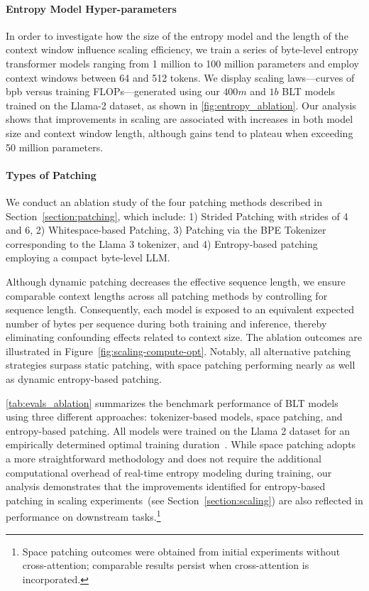 \paragraph{Entropy Model Hyper-parameters} In order to investigate how the size of the entropy model and the length of the context window influence scaling efficiency, we train a series of byte-level entropy transformer models ranging from 1 million to 100 million parameters and employ context windows between 64 and 512 tokens. We display scaling laws—curves of bpb versus training FLOPs—generated using our $400m$ and $1b$ {\textsc BLT} models trained on the Llama-2 dataset, as shown in \autoref{fig:entropy_ablation}. Our analysis shows that improvements in scaling are associated with increases in both model size and context window length, although gains tend to plateau when exceeding 50 million parameters.

\paragraph{Types of Patching}

We conduct an ablation study of the four patching methods described in Section~\ref{section:patching}, which include: 1) Strided Patching with strides of 4 and 6, 2) Whitespace-based Patching, 3) Patching via the BPE Tokenizer corresponding to the Llama 3 tokenizer, and 4) Entropy-based patching employing a compact byte-level LLM.

Although dynamic patching decreases the effective sequence length, we ensure comparable context lengths across all patching methods by controlling for sequence length. Consequently, each model is exposed to an equivalent expected number of bytes per sequence during both training and inference, thereby eliminating confounding effects related to context size. The ablation outcomes are illustrated in Figure~\ref{fig:scaling-compute-opt}. Notably, all alternative patching strategies surpass static patching, with space patching performing nearly as well as dynamic entropy-based patching.

\autoref{tab:evals_ablation} summarizes the benchmark performance of {\textsc BLT} models using three different approaches: tokenizer-based models, space patching, and entropy-based patching. All models were trained on the Llama 2 dataset for an empirically determined optimal training duration~\citep{dubey2024llama}. While space patching adopts a more straightforward methodology and does not require the additional computational overhead of real-time entropy modeling during training, our analysis demonstrates that the improvements identified for entropy-based patching in scaling experiments~(see Section~\ref{section:scaling}) are also reflected in performance on downstream tasks.\footnote{Space patching outcomes were obtained from initial experiments without cross-attention; comparable results persist when cross-attention is incorporated.}

